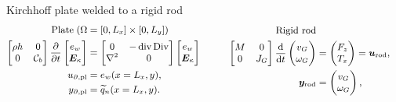 \documentclass[aspectratio=169]{ISAE-Beamer}
\DeclareMathOperator*{\Div}{Div}
\renewcommand{\div}{\operatorname{div}}
\begin{document}
\begin{frame}{Kirchhoff plate welded to a rigid rod}
\begin{equation*}\small
\begin{aligned}
\text{Plate} \; (\Omega &= [0, L_x] \times [0, L_y]) \\
\begin{bmatrix}
\rho h & 0 \\ 0 & \mathcal{\bm{C}}_b \\
\end{bmatrix}
\diffp{}{t}
\begin{bmatrix}
{e}_w \\ \bm{E}_\kappa \\
\end{bmatrix} &= 
\begin{bmatrix}
0 & -\div\Div \\ \nabla^2 & 0 \\
\end{bmatrix}
\begin{bmatrix}
{e}_w \\ \bm{E}_\kappa \\
\end{bmatrix} \\
u_{\partial, \text{pl}} &= {e}_w (x = L_x, y), \\
y_{\partial, \text{pl}} &= \widetilde{q}_n(x = L_x, y).
\end{aligned} \qquad \quad
\begin{aligned}
\text{Rigid rod} \\
\begin{bmatrix}
M & 0 \\
0   & J_G \\
\end{bmatrix} 
\displaystyle \diff{}{t}
\begin{pmatrix}
v_G \\ \omega_G \\
\end{pmatrix} & = \begin{pmatrix}
F_z \\ T_x \\
\end{pmatrix} = \bm{u}_{\text{rod}}\vspace{1mm}, \\
\bm{y}_{\text{rod}} &= \begin{pmatrix}
v_G \\ \omega_{G} \\
\end{pmatrix},
\end{aligned}

\end{equation*}
\end{frame}
\end{document}
